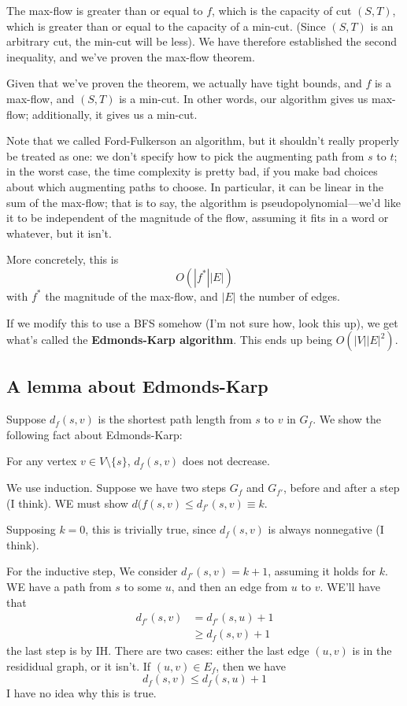 \documentclass{article}
\begin{document}
The max-flow is greater than or equal to $f$, which is the capacity of cut
$(S,T)$, which is greater than or equal to the capacity of a min-cut.
(Since $(S,T)$ is an arbitrary cut, the min-cut will be less).
We have therefore established the second inequality, and we've proven
the max-flow theorem.

Given that we've proven the theorem, we actually have tight bounds, and
$f$ is a max-flow, and $(S,T)$ is a min-cut.
In other words, our algorithm gives us max-flow; additionally, it gives us
a min-cut.

Note that we called Ford-Fulkerson an algorithm, but it shouldn't really
properly be treated as one: we don't specify how to pick the augmenting
path from $s$ to $t$; in the worst case, the time complexity is pretty bad,
if you make bad choices about which augmenting paths to choose.
In particular, it can be linear in the sum of the max-flow; that is to say,
the algorithm is pseudopolynomial---we'd like it to be independent of the
magnitude of the flow, assuming it fits in a word or whatever, but it isn't.

More concretely, this is
$$
O(|f^*| |E|)
$$
with $f^*$ the magnitude of the max-flow, and $|E|$ the number of edges.

If we modify this to use a BFS somehow (I'm not sure how, look this up), we
get what's called the \textbf{Edmonds-Karp algorithm}.
This ends up being $O(|V| |E|^2)$.

\subsection{A lemma about Edmonds-Karp}

Suppose $d_f(s,v)$ is the shortest path length from $s$ to $v$ in $G_f$.
We show the following fact about Edmonds-Karp:

For any vertex $v\in V\setminus \{s\}$, $d_f(s,v)$ does not decrease.

We use induction. Suppose we have two steps $G_f$ and $G_{f'}$, before
and after a step (I think).
WE must show $d(f(s,v) \leq d_{f'} (s,v) \equiv k$.

Supposing $k=0$, this is trivially true, since $d_f(s,v)$ is always 
nonnegative (I think).

For the inductive step, We consider $d_{f'}(s,v) = k+1$, assuming it holds
for $k$.
WE have a path from $s$ to some $u$, and then an edge from $u$ to $v$.
WE'll have that
\begin{align}
d_{f'}(s,v) 
& = d_{f'}(s,u) + 1 \\
&\geq d_f(s,v) + 1
\end{align}
the last step is by IH.
There are two cases: either the last edge $(u,v)$ is in the resididual
graph, or it isn't.
If $(u,v)\in E_f$, then we have
$$
d_f(s,v) \leq d_f(s,u) + 1
$$
I have no idea why this is true.
\end{document}
